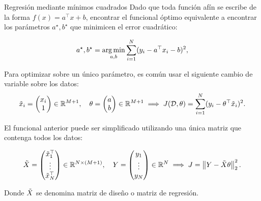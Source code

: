\documentclass[handout, 9pt]{beamer}
\begin{document}
\begin{frame}{Regresión mediante mínimos cuadrados}
	Dado que toda función afín se escribe de la forma $f(x)=a^\top x + b$, encontrar el funcional óptimo equivalente a encontrar los parámetros $a^\star,b^\star$ que minimicen el error cuadrático:
	
	\begin{equation*}
	a^\star,b^\star = \operatorname*{arg\,min}_{a,b} \sum_{i=1}^N(y_i-a^
	\top x_i - b)^2,
\end{equation*} \pause

Para optimizar sobre un único parámetro, es común usar el siguiente cambio de variable sobre los datos:
\begin{equation*}
  \tilde{x}_i = \left( \begin{matrix}x_i \\  1\end{matrix}\right) \in\mathbb{R}^{M+1},\quad
  \theta = \left( \begin{matrix}a \\  b\end{matrix}\right)\in\mathbb{R}^{M+1} \implies J({\mathcal D},\theta) = \sum_{i=1}^N(y_i-\theta^
	\top \tilde{x}_i)^2.
\end{equation*}\pause

El funcional anterior puede ser simplificado utilizando una única matriz que contenga todos los datos:

\begin{equation*}
  \tilde{X} = \left( \begin{matrix}\tilde{x}_1^\top \\\vdots \\ \tilde{x}_N^\top \end{matrix}\right)\in\mathbb{R}^{N\times (M+1)} ,\quad
  Y = \left( \begin{matrix}y_1 \\\vdots \\y_N \end{matrix}\right) \in\mathbb{R}^{N} \implies J = \left\lVert Y-\tilde{X}\theta\right\rVert_2^2.
\end{equation*}

Donde $\tilde{X}$ se denomina matriz de diseño o matriz de regresión. 
	
\end{frame}
\end{document}
